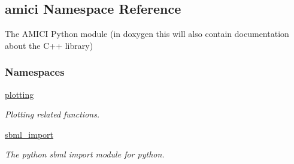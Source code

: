 \hypertarget{namespaceamici}{}\subsection{amici Namespace Reference}
\label{namespaceamici}


The A\+M\+I\+CI Python module (in doxygen this will also contain documentation about the C++ library)  


\subsubsection*{Namespaces}
\begin{DoxyCompactItemize}
\item 
 \mbox{\hyperlink{namespaceamici_1_1plotting}{plotting}}
\begin{DoxyCompactList}\small\item\em Plotting related functions. \end{DoxyCompactList}\item 
 \mbox{\hyperlink{namespaceamici_1_1sbml__import}{sbml\+\_\+import}}
\begin{DoxyCompactList}\small\item\em The python sbml import module for python. \end{DoxyCompactList}\end{DoxyCompactItemize}
